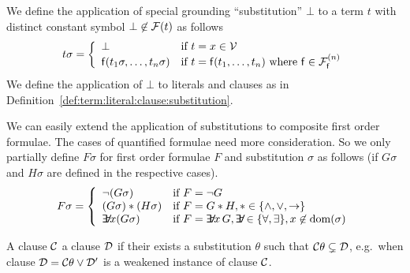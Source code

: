 \begin{definition}\label{def:term:literal:clause:substitution}
	We define the application of special grounding “substitution” \( \bot \) to a term \( t \) with distinct constant symbol \( \bot \not\in\mcF(t) \)
	as follows
	\begin{gather*}
	\MDEFINE{t\sigma}{ll}{
			\bot & \text{if }t=x\in\mcV
			\\
			\mf(t_1\sigma,\ldots,t_n\sigma)	&\text{if }t=\mf(t_1,\ldots,t_n)
			\text{ where  }
			 \mf\in\mcFfn
			 }
	\end{gather*}
	We define the application of \( \bot \) to literals and clauses as in
	Definition~\vref{def:term:literal:clause:substitution}.

\end{definition}

\begin{definition}
	We can easily extend the application of substitutions
	to composite first order formulae.
	The cases of quantified formulae need more consideration.
	So we only partially define \( F\sigma \) for first order formulae \( F \) and substitution \( \sigma \) as follows (if \( G\sigma \) and \( H\sigma \) are defined in the respective cases).
	\begin{gather*}
	\MDEFINE{F\sigma}{ll}{
		\lnot(G\sigma) & \text{if }F = \lnot G
		\\
		(G\sigma) * (H\sigma) & \text{if }F = G * H, *\in \{ \land, \lor, \limp \}
		\\
		\quantify x (G\sigma) &\text{if }F = \quantify x\,G,
		\quantify \in \{ \forall, \exists \},
		x\not\in\domain(\sigma)
	}
	\end{gather*}
\end{definition}

\begin{definition}
	A clause \( \mcC \)  a clause \( \mcD \) if their exists a substitution \( \theta \) such that \( \mcC\theta \subsetneq \mcD \),
	e.g.~when clause \( \mcD = \mcC\theta \lor \mcD' \) is a weakened instance of clause \( \mcC \).
\end{definition}

